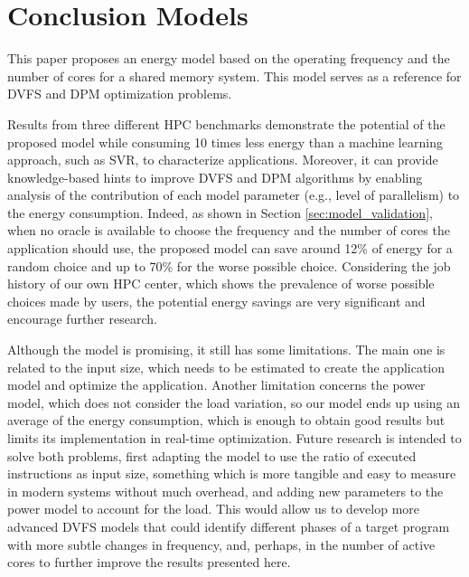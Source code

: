 \section{Conclusion Models} \label{sec:conclusion_models}
This paper proposes an energy model based on the operating frequency and the number of cores for a shared memory system. This model serves as a reference for DVFS and DPM optimization problems.

Results from three different HPC benchmarks demonstrate the potential of the proposed model while consuming 10 times less energy than a machine learning approach, such as SVR, to characterize applications. Moreover, it can provide knowledge-based hints to improve DVFS and DPM algorithms by enabling analysis of the contribution of each model parameter (e.g., level of parallelism) to the energy consumption. Indeed, as shown in Section \ref{sec:model_validation}, when no oracle is available to choose the frequency and the number of cores the application should use, the proposed model can save around 12\% of energy for a random choice and up to 70\% for the worse possible choice. Considering the job history of our own HPC center, which shows the prevalence of worse possible choices made by users, the potential energy savings are very significant and encourage further research.

Although the model is promising, it still has some limitations. The main one is related to the input size, which needs to be estimated to create the application model and optimize the application. Another limitation concerns the power model, which does not consider the load variation, so our model ends up using an average of the energy consumption, which is enough to obtain good results but limits its implementation in real-time optimization.
Future research is intended to solve both problems, first adapting the model to use the ratio of executed instructions as input size, something which is more tangible and easy to measure in modern systems without much overhead, and adding  new parameters to the power model to account for the load. This would allow us to develop more advanced DVFS models that could identify different phases of a target program with more subtle changes in frequency, and, perhaps, in the number of active cores to  further improve the results presented here.



